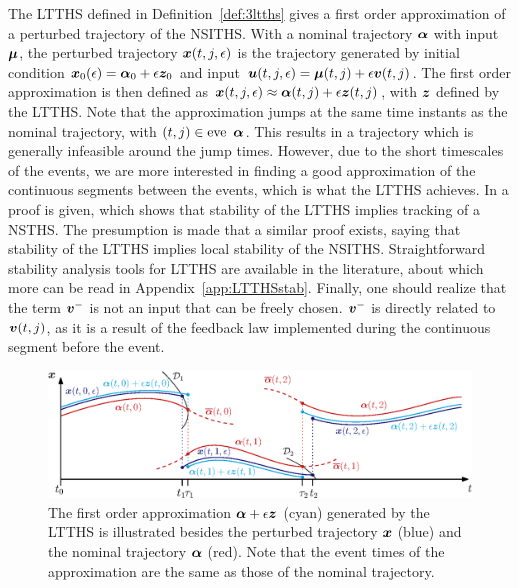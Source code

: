 \documentclass[../DC2017114Bouma.tex]{subfiles}
\begin{document}
The LTTHS defined in Definition~\ref{def:3ltths} gives a first order approximation of a perturbed trajectory of the NSITHS. With a nominal trajectory $\boldsymbol{\alpha}$ with input $\boldsymbol{\mu}$, the perturbed trajectory ${\boldsymbol{x}}(t,j,\epsilon)$ is the trajectory generated by initial condition ${\boldsymbol{x}}_0(\epsilon) = \boldsymbol{\alpha}_0 + \epsilon{\boldsymbol{z}}_0$ and input ${\boldsymbol{u}}(t,j,\epsilon) = \boldsymbol{\mu}(t,j) + \epsilon{\boldsymbol{v}}(t,j)$. The first order approximation is then defined as ${\boldsymbol{x}}(t,j,\epsilon) \approx \boldsymbol{\alpha}(t,j) + \epsilon{\boldsymbol{z}}(t,j)$, with ${\boldsymbol{z}}$ defined by the LTTHS. Note that the approximation jumps at the same time instants as the nominal trajectory, with $(t,j) \in \operatorname{\textnormal{eve}}\ \boldsymbol{\alpha}$. This results in a trajectory which is generally infeasible around the jump times. However, due to the short timescales of the events, we are more interested in finding a good approximation of the continuous segments between the events, which is what the LTTHS achieves. In \cite{Rijnen2017} a proof is given, which shows that stability of the LTTHS implies tracking of a NSTHS. The presumption is made that a similar proof exists, saying that stability of the LTTHS implies local stability of the NSITHS. Straightforward stability analysis tools for LTTHS are available in the literature, about which more can be read in Appendix~\ref{app:LTTHSstab}. Finally, one should realize that the term ${\boldsymbol{v}}^-$ is not an input that can be freely chosen. ${\boldsymbol{v}}^-$ is directly related to ${\boldsymbol{v}}(t,j)$, as it is a result of the feedback law implemented during the continuous segment before the event.
\begin{figure}[h]
\centering
\includegraphics[width=.95\textwidth]{refspreadapprox.eps}\caption{The first order approximation $\boldsymbol{\alpha} + \epsilon{\boldsymbol{z}}$ (cyan) generated by the LTTHS is illustrated besides the perturbed trajectory ${\boldsymbol{x}}$ (blue) and the nominal trajectory $\boldsymbol{\alpha}$ (red). Note that the event times of the approximation are the same as those of the nominal trajectory.} \label{fig:3refspreadapprox}
\end{figure}
\end{document}
